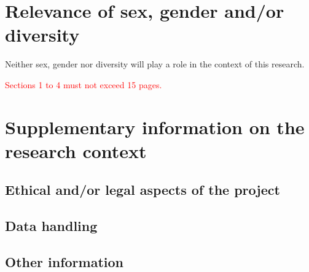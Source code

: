 \documentclass{scrartcl}
\newcommand\todo[1]{\textcolor{red}{#1}}
\begin{document}
\printbibliography[heading=none]

\section{Relevance of sex, gender and/or diversity}

Neither sex, gender nor diversity will play a role in the context of this research. 

\todo{Sections 1 to 4 must not exceed 15 pages.}

\pagebreak

\section{Supplementary information on the research context}

\subsection{Ethical and/or legal aspects of the project}


\subsection{Data handling}


\subsection{Other information}
\end{document}
